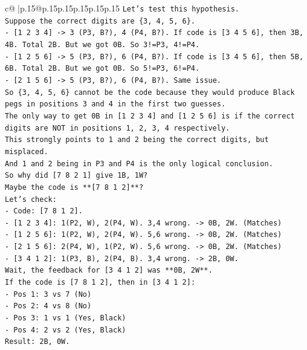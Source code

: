\documentclass{article}
\begin{document}
{\begin{supertabular}{c@{$\;$}|p{.15\linewidth}@{}p{.15\linewidth}p{.15\linewidth}p{.15\linewidth}p{.15\linewidth}p{.15\linewidth}}
{{{\texttt{Let's test this hypothesis.} \\
\texttt{Suppose the correct digits are \{3, 4, 5, 6\}.} \\
\texttt{{-} {[}1 2 3 4{]} {-}> 3 (P3, B?), 4 (P4, B?). If code is {[}3 4 5 6{]}, then 3B, 4B. Total 2B. But we got 0B. So 3!=P3, 4!=P4.} \\
\texttt{{-} {[}1 2 5 6{]} {-}> 5 (P3, B?), 6 (P4, B?). If code is {[}3 4 5 6{]}, then 5B, 6B. Total 2B. But we got 0B. So 5!=P3, 6!=P4.} \\
\texttt{{-} {[}2 1 5 6{]} {-}> 5 (P3, B?), 6 (P4, B?). Same issue.} \\
\texttt{So \{3, 4, 5, 6\} cannot be the code because they would produce Black pegs in positions 3 and 4 in the first two guesses.} \\
\texttt{The only way to get 0B in {[}1 2 3 4{]} and {[}1 2 5 6{]} is if the correct digits are NOT in positions 1, 2, 3, 4 respectively.} \\
\texttt{This strongly points to 1 and 2 being the correct digits, but misplaced.} \\
\texttt{And 1 and 2 being in P3 and P4 is the only logical conclusion.} \\
\texttt{So why did {[}7 8 2 1{]} give 1B, 1W?} \\
\texttt{Maybe the code is **{[}7 8 1 2{]}**?} \\
\texttt{Let's check:} \\
\texttt{{-} Code: {[}7 8 1 2{]}.} \\
\texttt{{-} {[}1 2 3 4{]}: 1(P2, W), 2(P4, W). 3,4 wrong. {-}> 0B, 2W. (Matches)} \\
\texttt{{-} {[}1 2 5 6{]}: 1(P2, W), 2(P4, W). 5,6 wrong. {-}> 0B, 2W. (Matches)} \\
\texttt{{-} {[}2 1 5 6{]}: 2(P4, W), 1(P2, W). 5,6 wrong. {-}> 0B, 2W. (Matches)} \\
\texttt{{-} {[}3 4 1 2{]}: 1(P3, B), 2(P4, B). 3,4 wrong. {-}> 2B, 0W.} \\
\texttt{Wait, the feedback for {[}3 4 1 2{]} was **0B, 2W**.} \\
\texttt{If the code is {[}7 8 1 2{]}, then in {[}3 4 1 2{]}:} \\
\texttt{{-} Pos 1: 3 vs 7 (No)} \\
\texttt{{-} Pos 2: 4 vs 8 (No)} \\
\texttt{{-} Pos 3: 1 vs 1 (Yes, Black)} \\
\texttt{{-} Pos 4: 2 vs 2 (Yes, Black)} \\
\texttt{Result: 2B, 0W.} \\
}}}
\end{supertabular}}
\end{document}
